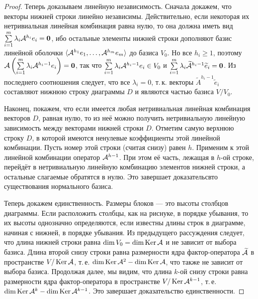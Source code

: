 \begin{proof}
    Теперь доказываем линейную независимость. Сначала докажем, что векторы нижней строки линейно независимы. Действительно, если некоторая их нетривиальная линейная комбинация равна нулю, то она должна иметь вид $\sum\limits_{i = 1}^m\lambda_i\mathcal{A}^{h_i}e_i = \boldsymbol{0}$, ибо остальные элементы нижней строки дополняют базис линейной оболочки $\langle \mathcal{A}^{h_1}e_1, \ldots, \mathcal{A}^{h_m}e_m \rangle$ до базиса $V_0$. Но все $h_i \geqslant 1$, поэтому $\mathcal{A}\left(\sum\limits_{i = 1}^m\lambda_i\mathcal{A}^{h_i - 1}e_i\right) = \boldsymbol{0}$, так что $\sum\limits_{i = 1}^m\lambda_i\mathcal{A}^{h_i - 1}e_i \in V_0$ и $\sum\limits_{i = 1}^m\lambda_i\widetilde{\mathcal{A}}^{h_i - 1}\widetilde{e}_i = \boldsymbol{0}$. Из последнего соотношения следует, что все $\lambda_i = 0$, т.\,к. векторы $\widetilde{A}^{h_i - 1}\widetilde{e}_i$ составляют нижнюю строку диаграммы $D$ и являются частью базиса $V / V_0$.

    Наконец, покажем, что если имеется любая нетривиальная линейная комбинация векторов $D$, равная нулю, то из неё можно получить нетривиальную линейную зависимость между векторами нижней строки $D$. Отметим самую верхнюю строку $D$, в которой имеются ненулевые коэффициенты этой линейной комбинации. Пусть номер этой строки (считая снизу) равен $h$. Применим к этой линейной комбинации оператор $\mathcal{A}^{h - 1}$. При этом её часть, лежащая в $h$-ой строке, перейдёт в нетривиальную линейную комбинацию элементов нижней строки, а остальные слагаемые обратятся в нулю. Это завершает доказательсвто существования нормального базиса.

    Теперь докажем единственность. Размеры блоков --- это высоты столбцов диаграммы. Если расположить столбцы, как на риснуке, в порядке убывания, то их высоты однозначно определяются, если известны длины строк в диаграмме, начиная с нижней, в порядке убывания. Из предыдущего рассуждения следует, что длина нижней строки равна $\dim V_0 = \dim\operatorname{Ker}\mathcal{A}$ и не зависит от выбора базиса. Длина второй снизу строки равна размерности ядра фактор-оператора $\widetilde{\mathcal{A}}$ в пространстве $V / \operatorname{Ker}\mathcal{A}$, т.\,е. $\dim\operatorname{Ker}\mathcal{A}^2 - \dim\operatorname{Ker}\mathcal{A}$, что также не зависит от выбора базиса. Продолжая далее, мы видим, что длина $k$-ой снизу строки равна размерности ядра фактор-оператора в пространстве $V / \operatorname{Ker}\mathcal{A}^{k - 1}$, т.\,е. $\dim\operatorname{Ker}\mathcal{A}^k - \dim\operatorname{Ker}\mathcal{A}^{k - 1}$. Это завершает доказательство единственности.
\end{proof}

